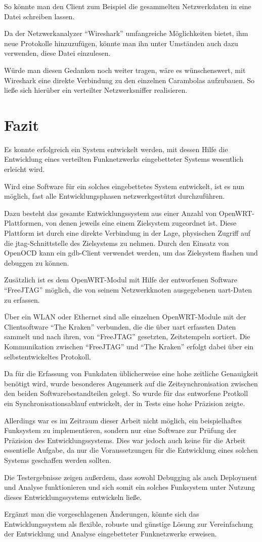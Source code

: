 So könnte man den Client zum Beispiel die gesammelten Netzwerkdaten in eine
Datei schreiben lassen.

Da der Netzwerkanalyzer "`Wireshark"'\cite{WIRESH} umfangreiche Möglichkeiten
bietet, ihm neue Protokolle hinzuzufügen, könnte man ihn unter Umständen auch
dazu verwenden, diese Datei einzulesen.

Würde man diesen Gedanken noch weiter tragen, wäre es wünschenswert, mit
Wireshark eine direkte Verbindung zu den einzelnen Carambolas aufzubauen. So
ließe sich hierüber ein verteilter Netzwerksniffer realisieren.
\section{Fazit}
Es konnte erfolgreich ein System entwickelt werden, mit dessen Hilfe die
Entwicklung eines verteilten Funknetzwerks eingebetteter Systems wesentlich
erleicht wird.

Wird eine Software für ein solches eingebettetes System entwickelt, ist es
nun möglich, fast alle Entwicklungsphasen netzwerkgestützt durchzuführen.

Dazu besteht das gesamte Entwicklungssystem aus einer Anzahl von
OpenWRT-Plattformen, von denen jeweils eine einem Zielsystem
zugeordnet ist. Diese Plattform ist durch eine direkte Verbindung in der
Lage, physischen Zugriff auf die \gls{jtag}-Schnittstelle des Zielsystems zu
nehmen. Durch den Einsatz von OpenOCD kann ein \gls{gdb}-Client verwendet
werden, um das Zielsystem flashen und debuggen zu können.

Zusätzlich ist es dem OpenWRT-Modul mit Hilfe der entworfenen Software
"`FreeJTAG"' möglich, die von seinem Netzwerkknoten ausgegebenen
\gls{uart}-Daten zu erfassen.

Über ein WLAN oder Ethernet sind alle einzelnen OpenWRT-Module mit der
Clientsoftware "`The Kraken"' verbunden, die die über \gls{uart} erfassten Daten
sammelt und nach ihren, von "`FreeJTAG"' gesetzten, Zeitstempeln sortiert. Die
Kommunikation zwischen "`FreeJTAG"' und "`The Kraken"' erfolgt dabei über ein
selbstentwickeltes Protokoll.

Da für die Erfassung von Funkdaten üblicherweise eine hohe zeitliche Genauigkeit
benötigt wird, wurde besonderes Augenmerk auf die Zeitsynchronisation zwischen
den beiden Softwarebestandteilen gelegt. So wurde für das entworfene Protkoll
ein Synchronisationsablauf entwickelt, der in Tests eine hohe Präzision zeigte.

Allerdings war es im Zeitraum dieser Arbeit nicht möglich, ein beispielhaftes
Funksystem zu implementieren, sondern nur eine Software zur Prüfung der
Präzision des Entwicklungssystems. Dies war jedoch auch keine für die Arbeit
essentielle Aufgabe, da nur die Voraussetzungen für die Entwicklung eines
solchen Systems geschaffen werden sollten.

Die Testergebnisse zeigen außerdem, dass sowohl Debugging als auch Deployment
und Analyse funktionieren und sich somit ein solches Funksystem unter
Nutzung dieses Entwicklungssystems entwickeln ließe.

Ergänzt man die vorgeschlagenen Änderungen, könnte sich das Entwicklungssystem
als flexible, robuste und günstige Lösung zur Vereinfachung der Entwicklung
und Analyse eingebetteter Funknetzwerke erweisen.